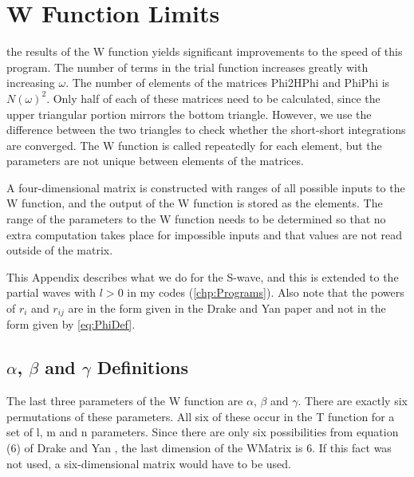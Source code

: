 \documentclass[Dissertation.tex]{subfiles}
\begin{document}
\chapter{W Function Limits}
\label{chp:WLimits}

\iftoggle{UNT}{Precalculating}{\lettrine{\textcolor{startcolor}{P}}{recalculating}}
the results of the W 
function yields significant improvements to the speed of this program.  The 
number of terms in the trial function increases greatly with increasing
$\omega$. The number of elements of the matrices Phi2HPhi and PhiPhi is
$N(\omega)^2$. Only half of each of these matrices need to be calculated, 
since the upper triangular portion mirrors the bottom triangle. However, we 
use the difference between the two triangles to check whether the short-short 
integrations are converged. The W function is called repeatedly for each 
element, but the parameters are not unique between elements of the matrices.

A four-dimensional matrix is constructed with ranges of all possible inputs 
to the W function, and the output of the W function is stored as the 
elements.  The range of the parameters to the W function needs to be 
determined so that no extra computation takes place for impossible inputs and 
that values are not read outside of the matrix.

This Appendix describes what we do for the S-wave, and this is extended to the 
partial waves with $l > 0$ in my codes (\cref{chp:Programs}).
Also note that the powers of $r_i$ and $r_{ij}$ are in the form given in the
Drake and Yan \cite{Drake1995} paper and not in the form given by \cref{eq:PhiDef}.

\section{\texorpdfstring{$\alpha$, $\beta$ and $\gamma$} {alpha, beta and gamma} Definitions}

The last three parameters of the W function are $\alpha$, $\beta$ and $\gamma$.
There are exactly six permutations of these parameters. All six of these 
occur in the T function for a set of l, m and n parameters. Since there are 
only six possibilities from equation (6) of Drake and Yan \cite{Drake1995}, 
the last dimension of the WMatrix is 6. If this fact was not used, a
six-dimensional matrix would have to be used.
\end{document}

